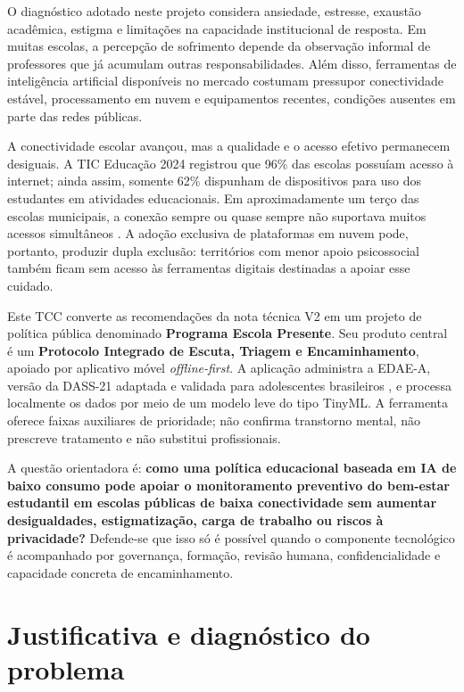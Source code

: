 \documentclass[
  12pt,
  openright,
  oneside,
  a4paper,
  english,
  brazil
]{abntex2}
\begin{document}
O diagnóstico adotado neste projeto considera ansiedade, estresse, exaustão
acadêmica, estigma e limitações na capacidade institucional de resposta. Em
muitas escolas, a percepção de sofrimento depende da observação informal de
professores que já acumulam outras responsabilidades.
Além disso, ferramentas de inteligência artificial disponíveis no mercado
costumam pressupor conectividade estável, processamento em nuvem e equipamentos
recentes, condições ausentes em parte das redes públicas.

A conectividade escolar avançou, mas a qualidade e o acesso efetivo permanecem
desiguais. A TIC Educação 2024 registrou que 96\% das escolas possuíam acesso à
internet; ainda assim, somente 62\% dispunham de dispositivos para uso dos
estudantes em atividades educacionais. Em aproximadamente um terço das escolas
municipais, a conexão sempre ou quase sempre não suportava muitos acessos
simultâneos \cite{cgi2025}. A adoção exclusiva de plataformas em nuvem pode,
portanto, produzir dupla exclusão: territórios com menor apoio psicossocial
também ficam sem acesso às ferramentas digitais destinadas a apoiar esse
cuidado.

Este TCC converte as recomendações da nota técnica V2 em um projeto de política
pública denominado \textbf{Programa Escola Presente}. Seu produto central é um
\textbf{Protocolo Integrado de Escuta, Triagem e Encaminhamento}, apoiado por
aplicativo móvel \emph{offline-first}. A aplicação administra a EDAE-A, versão
da DASS-21 adaptada e validada para adolescentes brasileiros
\cite{patias2016}, e processa localmente os dados por meio de um modelo leve do
tipo TinyML. A ferramenta oferece faixas auxiliares de prioridade; não confirma
transtorno mental, não prescreve tratamento e não substitui profissionais.

A questão orientadora é: \textbf{como uma política educacional baseada em IA de
baixo consumo pode apoiar o monitoramento preventivo do bem-estar estudantil em
escolas públicas de baixa conectividade sem aumentar desigualdades,
estigmatização, carga de trabalho ou riscos à privacidade?} Defende-se que isso
só é possível quando o componente tecnológico é acompanhado por governança,
formação, revisão humana, confidencialidade e capacidade concreta de
encaminhamento.

\chapter{Justificativa e diagnóstico do problema}
\end{document}
